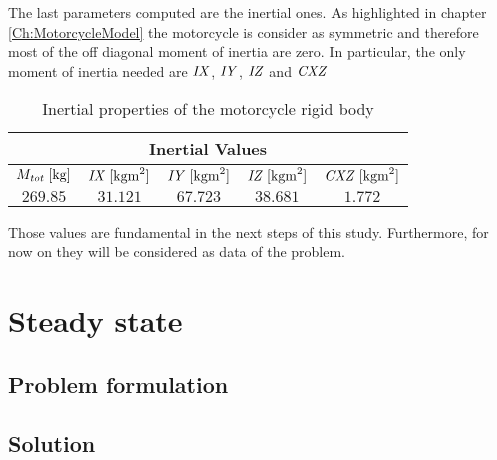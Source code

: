 The last parameters computed are the inertial ones. As highlighted in chapter \ref{Ch:MotorcycleModel} the motorcycle is consider as symmetric and therefore most of the off diagonal moment of inertia are zero. In particular, the only moment of inertia needed are ${\it IX}$, ${\it IY}$, ${\it IZ}$ and ${\it CXZ}$

%
\begin{table}[h!]
    \centering
    \begin{tabular}{@{}ccccc@{}}
    \toprule
    \multicolumn{5}{c}{\textbf{Inertial Values}} \\ \midrule
    $M_{{\it tot}} \; [\si{\kilogram}]$ & ${\it IX} \; [\si{\kilogram\metre^2}]$ & ${\it IY} \; [\si{\kilogram\metre^2}]$ & ${\it IZ} \; [\si{\kilogram\metre^2}]$ & ${\it CXZ} \; [\si{\kilogram\metre^2}]$\\
    $269.85$ & $31.121$ & $67.723$ & $38.681$ & $1.772$\\ \bottomrule
    \end{tabular}
    \caption{Inertial properties of the motorcycle rigid body}
    \label{tab:Inertia}
\end{table}
%

Those values are fundamental in the next steps of this study. Furthermore, for now on they will be considered as data of the problem. 

%
\section{Steady state}
%
\subsection{Problem formulation}
%
\subsection{Solution}
%
